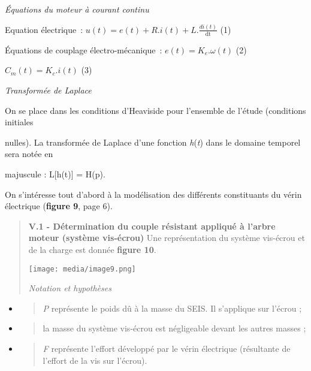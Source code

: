\documentclass[]{article}
\begin{document}
\emph{Équations du moteur à courant continu}

Equation électrique~:
\(u\left( t \right) = e\left( t \right) + R.i\left( t \right) + L.\frac{di(t)}{\text{dt}}\)
(1)

Équations de couplage électro-mécanique~:
\(e\left( t \right) = K_{e}.\omega(t)\) (2)

\(C_{m}\left( t \right) = K_{c}.i(t)\) (3)

\emph{Transformée de Laplace}

On se place dans les conditions d'Heaviside pour l'ensemble de l'étude
(conditions initiales

nulles). La transformée de Laplace d'une fonction \emph{h}(\emph{t})
dans le domaine temporel sera notée en

majuscule : L{[}h(t){]} = H(p).

On s'intéresse tout d'abord à la modélisation des différents
constituants du vérin électrique (\textbf{figure 9}, page 6).

\begin{quote}
\protect\hypertarget{page9}{}{}

\textbf{V.1 - Détermination du couple résistant appliqué à l'arbre
moteur (système vis-écrou)} Une représentation du système vis-écrou et
de la charge est donnée \textbf{figure 10}.

\texttt{[image: media/image9.png]}

\emph{Notation et hypothèses}
\end{quote}

\begin{itemize}
\item
  \begin{quote}
  \emph{P} représente le poids dû à la masse du SEIS. Il s'applique sur
  l'écrou ;
  \end{quote}
\item
  \begin{quote}
  la masse du système vis-écrou est négligeable devant les autres masses
  ;
  \end{quote}
\item
  \begin{quote}
  \emph{F} représente l'effort développé par le vérin électrique
  (résultante de l'effort de la vis sur l'écrou).
  \end{quote}
\end{itemize}
\end{document}
